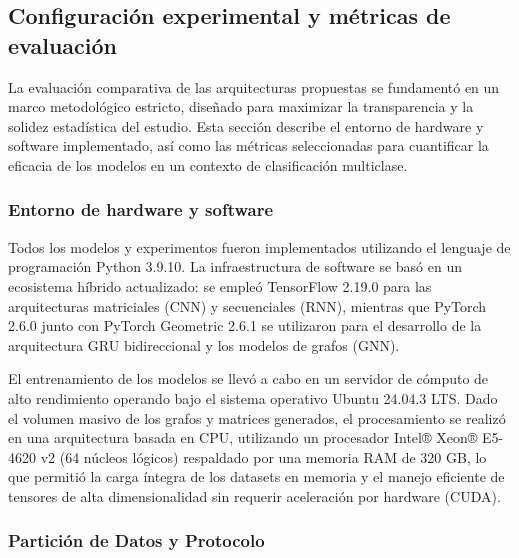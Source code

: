 \documentclass[review,12pt,times,number]{elsarticle}
\begin{document}

\subsection{Configuración experimental y métricas de evaluación}

La evaluación comparativa de las arquitecturas propuestas se fundamentó en un marco metodológico estricto, diseñado para maximizar la transparencia y la solidez estadística del estudio. Esta sección describe el entorno de hardware y software implementado, así como las métricas seleccionadas para cuantificar la eficacia de los modelos en un contexto de clasificación multiclase.

\subsubsection{Entorno de hardware y software}

Todos los modelos y experimentos fueron implementados utilizando el lenguaje de programación Python 3.9.10. La infraestructura de software se basó en un ecosistema híbrido actualizado: se empleó TensorFlow 2.19.0 para las arquitecturas matriciales (CNN) y secuenciales (RNN), mientras que PyTorch 2.6.0 junto con PyTorch Geometric 2.6.1 se utilizaron para el desarrollo de la arquitectura GRU bidireccional y los modelos de grafos (GNN).

El entrenamiento de los modelos se llevó a cabo en un servidor de cómputo de alto rendimiento operando bajo el sistema operativo Ubuntu 24.04.3 LTS. Dado el volumen masivo de los grafos y matrices generados, el procesamiento se realizó en una arquitectura basada en CPU, utilizando un procesador Intel® Xeon® E5-4620 v2 (64 núcleos lógicos) respaldado por una memoria RAM de 320 GB, lo que permitió la carga íntegra de los datasets en memoria y el manejo eficiente de tensores de alta dimensionalidad sin requerir aceleración por hardware (CUDA).

\subsubsection{Partición de Datos y Protocolo}
\end{document}
